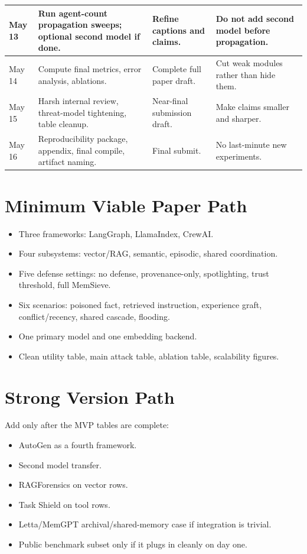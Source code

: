 \documentclass[11pt,oneside]{report}
\newcommand{\project}{MemSieve}
\begin{document}
\begin{longtable}{|L{0.11\textwidth}|L{0.32\textwidth}|L{0.27\textwidth}|L{0.20\textwidth}|}
May 13 & Run agent-count propagation sweeps; optional second model if done. & Refine captions and
claims. & Do not add second model before propagation. \\
\hline
May 14 & Compute final metrics, error analysis, ablations. & Complete full paper draft. & Cut weak
modules rather than hide them. \\
\hline
May 15 & Harsh internal review, threat-model tightening, table cleanup. & Near-final submission
draft. & Make claims smaller and sharper. \\
\hline
May 16 & Reproducibility package, appendix, final compile, artifact naming. & Final submit. & No
last-minute new experiments. \\
\hline
\end{longtable}

\section{Minimum Viable Paper Path}

\begin{itemize}
  \item Three frameworks: LangGraph, LlamaIndex, CrewAI.
  \item Four subsystems: vector/RAG, semantic, episodic, shared coordination.
  \item Five defense settings: no defense, provenance-only, spotlighting, trust threshold, full
        \project{}.
  \item Six scenarios: poisoned fact, retrieved instruction, experience graft, conflict/recency,
        shared cascade, flooding.
  \item One primary model and one embedding backend.
  \item Clean utility table, main attack table, ablation table, scalability figures.
\end{itemize}

\section{Strong Version Path}

Add only after the MVP tables are complete:

\begin{itemize}
  \item AutoGen as a fourth framework.
  \item Second model transfer.
  \item RAGForensics on vector rows.
  \item Task Shield on tool rows.
  \item Letta/MemGPT archival/shared-memory case if integration is trivial.
  \item Public benchmark subset only if it plugs in cleanly on day one.
\end{itemize}
\end{document}
